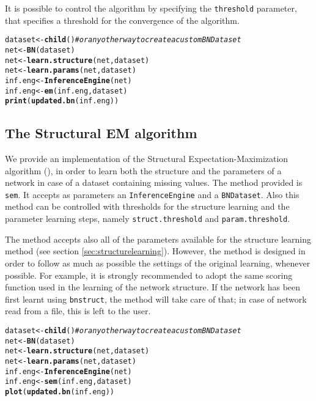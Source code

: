 \documentclass{article}\usepackage[]{graphicx}\usepackage[]{color}
\makeatletter
\newcommand{\hlcom}[1]{\textcolor[rgb]{0.678,0.584,0.686}{\textit{#1}}}%
\newcommand{\hlstd}[1]{\textcolor[rgb]{0.345,0.345,0.345}{#1}}%
\newcommand{\hlkwb}[1]{\textcolor[rgb]{0.69,0.353,0.396}{#1}}%
\newcommand{\hlkwd}[1]{\textcolor[rgb]{0.737,0.353,0.396}{\textbf{#1}}}%
\newenvironment{kframe}{%
 \def\at@end@of@kframe{}%
 \ifinner\ifhmode%
  \def\at@end@of@kframe{\end{minipage}}%
  \begin{minipage}{\columnwidth}%
 \fi\fi%
 \def\FrameCommand##1{\hskip\@totalleftmargin \hskip-\fboxsep
 \colorbox{shadecolor}{##1}\hskip-\fboxsep
     \hskip-\linewidth \hskip-\@totalleftmargin \hskip\columnwidth}%
 \MakeFramed {\advance\hsize-\width
   \@totalleftmargin\z@ \linewidth\hsize
   \@setminipage}}%
 {\par\unskip\endMakeFramed%
 \at@end@of@kframe}
\newenvironment{knitrout}{}{} %
\newcommand{\Robject}[1]{{\texttt{#1}}}
\newcommand{\Rpackage}[1]{{\texttt{#1}}}
\newcommand{\Rmethod}[1]{{\texttt{#1}}}
\newcommand{\Rfunarg}[1]{{\texttt{#1}}}
\makeatother
\begin{document}
It is possible to control the algorithm by specifying the \Rfunarg{threshold} parameter, that specifies a threshold
for the convergence of the algorithm.
\begin{knitrout}
\color{fgcolor}\begin{kframe}
\begin{alltt}
\hlstd{dataset} \hlkwb{<-} \hlkwd{child}\hlstd{()} \hlcom{# or any other way to create a custom BNDataset}
\hlstd{net}     \hlkwb{<-} \hlkwd{BN}\hlstd{(dataset)}
\hlstd{net}     \hlkwb{<-} \hlkwd{learn.structure}\hlstd{(net, dataset)}
\hlstd{net}     \hlkwb{<-} \hlkwd{learn.params}\hlstd{(net, dataset)}
\hlstd{inf.eng} \hlkwb{<-} \hlkwd{InferenceEngine}\hlstd{(net)}
\hlstd{inf.eng} \hlkwb{<-} \hlkwd{em}\hlstd{(inf.eng, dataset)}
\hlkwd{print}\hlstd{(}\hlkwd{updated.bn}\hlstd{(inf.eng))}
\end{alltt}
\end{kframe}
\end{knitrout}

\subsection{The Structural EM algorithm}
We provide an implementation of the Structural Expectation-Maximization algorithm
(\citet{friedman1997learning,friedman1998bayesian}),
in order to learn both the structure and the parameters of a network in case of a dataset containing missing values.
The method provided is \Rmethod{sem}. It accepts as parameters an \Robject{InferenceEngine} and a \Robject{BNDataset}.
Also this method can be controlled with thresholds for the structure learning and the parameter learning steps, namely
\Rfunarg{struct.threshold} and \Rfunarg{param.threshold}.

The method accepts also all of the parameters available for the structure learning method (see section \ref{sec:structurelearning}).
However, the method is designed in order to follow as much as possible the settings of the original learning, whenever possible.
For example, it is strongly recommended to adopt the same scoring function used in the learning of the network structure.
If the network has been first learnt using \Rpackage{bnstruct}, the method will take care of that;
in case of network read from a file, this is left to the user.

\begin{knitrout}
\color{fgcolor}\begin{kframe}
\begin{alltt}
\hlstd{dataset} \hlkwb{<-} \hlkwd{child}\hlstd{()} \hlcom{# or any other way to create a custom BNDataset}
\hlstd{net}     \hlkwb{<-} \hlkwd{BN}\hlstd{(dataset)}
\hlstd{net}     \hlkwb{<-} \hlkwd{learn.structure}\hlstd{(net, dataset)}
\hlstd{net}     \hlkwb{<-} \hlkwd{learn.params}\hlstd{(net, dataset)}
\hlstd{inf.eng} \hlkwb{<-} \hlkwd{InferenceEngine}\hlstd{(net)}
\hlstd{inf.eng} \hlkwb{<-} \hlkwd{sem}\hlstd{(inf.eng, dataset)}
\hlkwd{plot}\hlstd{(}\hlkwd{updated.bn}\hlstd{(inf.eng))}
\end{alltt}
\end{kframe}
\end{knitrout}
\end{document}
